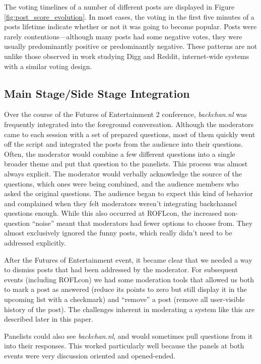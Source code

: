 The voting timelines of a number of different posts are displayed in Figure \ref{fig:post_score_evolution}. In most cases, the voting in the first five minutes of a posts lifetime indicate whether or not it was going to become popular. Posts were rarely contentious—although many posts had some negative votes, they were usually predominantly positive or predominantly negative. These patterns are not unlike those observed in work studying Digg and Reddit, internet-wide systems with a similar voting design. \citep{Lerman:2006wq}


\subsection{Main Stage/Side Stage Integration}
Over the course of the Futures of Entertainment 2 conference, \emph{backchan.nl} was frequently integrated into the foreground conversation. Although the moderators came to each session with a set of prepared questions, most of them quickly went off the script and integrated the posts from the audience into their questions. Often, the moderator would combine a few different questions into a single broader theme and put that question to the panelists. This process was almost always explicit. The moderator would verbally acknowledge the source of the questions, which ones were being combined, and the audience members who asked the original questions. The audience began to expect this kind of behavior and complained when they felt moderators weren't integrating backchannel questions enough. While this also occurred at ROFLcon, the increased non-question ``noise'' meant that moderators had fewer options to choose from. They almost exclusively ignored the funny posts, which really didn't need to be addressed explicitly.

After the Futures of Entertainment event, it became clear that we needed a way to dismiss posts that had been addressed by the moderator. For subsequent events (including ROFLcon) we had some moderation tools that allowed us both to mark a post as answered (reduce its points to zero but still display it in the upcoming list with a checkmark) and ``remove'' a post (remove all user-visible history of the post). The challenges inherent in moderating a system like this are described later in this paper.

Panelists could also see \emph{backchan.nl}, and would sometimes pull questions from it into their responses. This worked particularly well because the panels at both events were very discussion oriented and opened-ended.

